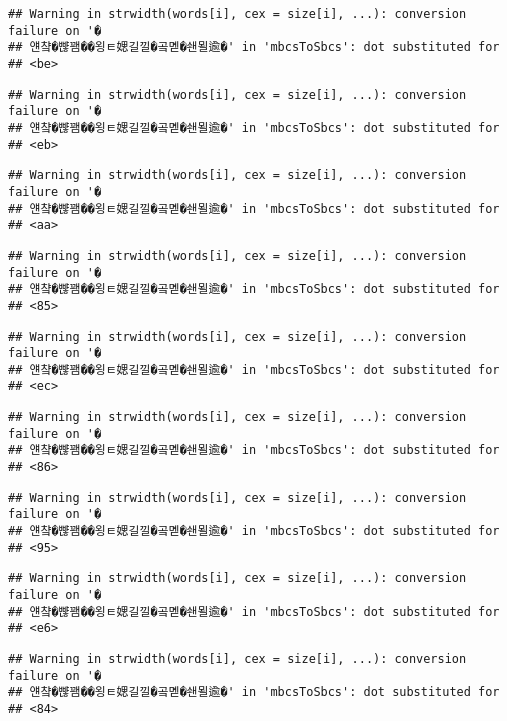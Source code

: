 \documentclass[]{article}
\begin{document}
\begin{verbatim}
## Warning in strwidth(words[i], cex = size[i], ...): conversion failure on '�
## 얜챸�뺞꽴��욍ㅌ媤길낄�곸몓�쇈묄逾�' in 'mbcsToSbcs': dot substituted for
## <be>
\end{verbatim}

\begin{verbatim}
## Warning in strwidth(words[i], cex = size[i], ...): conversion failure on '�
## 얜챸�뺞꽴��욍ㅌ媤길낄�곸몓�쇈묄逾�' in 'mbcsToSbcs': dot substituted for
## <eb>
\end{verbatim}

\begin{verbatim}
## Warning in strwidth(words[i], cex = size[i], ...): conversion failure on '�
## 얜챸�뺞꽴��욍ㅌ媤길낄�곸몓�쇈묄逾�' in 'mbcsToSbcs': dot substituted for
## <aa>
\end{verbatim}

\begin{verbatim}
## Warning in strwidth(words[i], cex = size[i], ...): conversion failure on '�
## 얜챸�뺞꽴��욍ㅌ媤길낄�곸몓�쇈묄逾�' in 'mbcsToSbcs': dot substituted for
## <85>
\end{verbatim}

\begin{verbatim}
## Warning in strwidth(words[i], cex = size[i], ...): conversion failure on '�
## 얜챸�뺞꽴��욍ㅌ媤길낄�곸몓�쇈묄逾�' in 'mbcsToSbcs': dot substituted for
## <ec>
\end{verbatim}

\begin{verbatim}
## Warning in strwidth(words[i], cex = size[i], ...): conversion failure on '�
## 얜챸�뺞꽴��욍ㅌ媤길낄�곸몓�쇈묄逾�' in 'mbcsToSbcs': dot substituted for
## <86>
\end{verbatim}

\begin{verbatim}
## Warning in strwidth(words[i], cex = size[i], ...): conversion failure on '�
## 얜챸�뺞꽴��욍ㅌ媤길낄�곸몓�쇈묄逾�' in 'mbcsToSbcs': dot substituted for
## <95>
\end{verbatim}

\begin{verbatim}
## Warning in strwidth(words[i], cex = size[i], ...): conversion failure on '�
## 얜챸�뺞꽴��욍ㅌ媤길낄�곸몓�쇈묄逾�' in 'mbcsToSbcs': dot substituted for
## <e6>
\end{verbatim}

\begin{verbatim}
## Warning in strwidth(words[i], cex = size[i], ...): conversion failure on '�
## 얜챸�뺞꽴��욍ㅌ媤길낄�곸몓�쇈묄逾�' in 'mbcsToSbcs': dot substituted for
## <84>
\end{verbatim}
\end{document}
